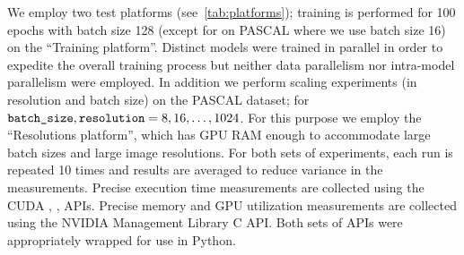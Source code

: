 

We employ two test platforms (see~\cref{tab:platforms});
training is performed for 100 epochs with batch size 128 (except for on PASCAL where we use batch size 16) on the ``Training platform''.
Distinct models were trained in parallel in order to expedite the overall training process but neither data parallelism nor intra-model parallelism were employed.
In addition we perform scaling experiments (in resolution and batch size) on the PASCAL dataset;
for $\texttt{batch\_size}, \texttt{resolution} = 8, 16, \dots, 1024$.
For this purpose we employ the ``Resolutions platform'', which has GPU RAM enough to accommodate large batch sizes and large image resolutions.
For both sets of experiments, each run is repeated 10 times and results are averaged to reduce variance in the measurements.
Precise execution time measurements are collected using the CUDA , ,  APIs.
Precise memory and GPU utilization measurements are collected using the NVIDIA Management Library C API\@.
Both sets of APIs were appropriately wrapped for use in Python.




